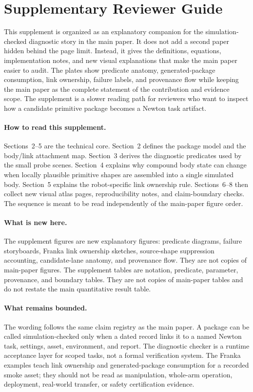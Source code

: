 \section{Supplementary Reviewer Guide}

This supplement is organized as an explanatory companion for the simulation-checked diagnostic story in
the main paper. It does not add a second paper hidden behind the page limit. Instead, it gives the
definitions, equations, implementation notes, and new visual explanations that make the main
paper easier to audit. The plates show predicate anatomy, generated-package consumption, link
ownership, failure labels, and provenance flow while keeping the main paper as the complete
statement of the contribution and evidence scope. The supplement is a slower reading path for
reviewers who want to inspect how a candidate primitive package becomes a Newton task artifact.

\paragraph{How to read this supplement.}
Sections~2--5 are the technical core. Section~2 defines the package model and the body/link
attachment map. Section~3 derives the diagnostic predicates used by the small probe scenes.
Section~4 explains why compound body state can change when locally plausible primitive shapes are
assembled into a single simulated body. Section~5 explains the robot-specific link ownership rule.
Sections~6--8 then collect new visual atlas pages, reproducibility notes, and claim-boundary
checks. The sequence is meant to be read independently of the main-paper figure order.

\paragraph{What is new here.}
The supplement figures are new explanatory figures: predicate diagrams, failure storyboards,
Franka link ownership sketches, source-shape suppression accounting, candidate-lane anatomy, and
provenance flow. They are not copies of main-paper figures. The supplement tables are notation,
predicate, parameter, provenance, and boundary tables. They are not copies of main-paper tables and
do not restate the main quantitative result table.

\paragraph{What remains bounded.}
The wording follows the same claim registry as the main paper. A package can be called
simulation-checked only when a dated record links it to a named Newton task, settings, asset,
environment, and report. The diagnostic checker is a runtime acceptance layer for scoped tasks, not
a formal verification system. The Franka examples teach link ownership and generated-package
consumption for a recorded smoke asset; they should not be read as manipulation, whole-arm
operation, deployment, real-world transfer, or safety certification evidence.


